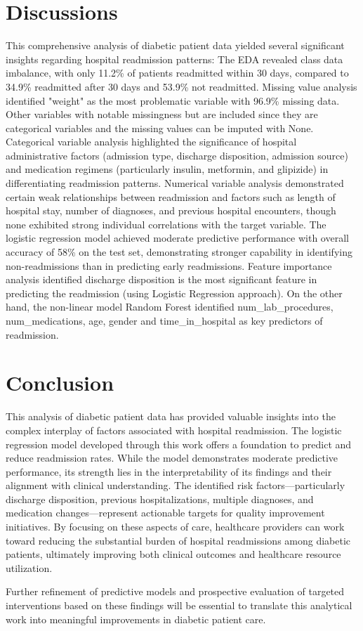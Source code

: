 \section{Discussions}

This comprehensive analysis of diabetic patient data yielded several significant insights regarding hospital readmission patterns: The EDA revealed class data imbalance, with only 11.2\% of patients readmitted within 30 days, compared to 34.9\% readmitted after 30 days and 53.9\% not readmitted.
Missing value analysis identified "weight" as the most problematic variable with 96.9\% missing data. 
Other variables with notable missingness but are included since they are categorical variables and the missing values can be imputed with None.
Categorical variable analysis highlighted the significance of hospital administrative factors (admission type, discharge disposition, admission source) and medication regimens (particularly insulin, metformin, and glipizide) in differentiating readmission patterns.
Numerical variable analysis demonstrated certain weak relationships between readmission and factors such as length of hospital stay, number of diagnoses, and previous hospital encounters, though none exhibited strong individual correlations with the target variable.
The logistic regression model achieved moderate predictive performance with overall accuracy of 58\% on the test set, demonstrating stronger capability in identifying non-readmissions than in predicting early readmissions.
Feature importance analysis identified discharge disposition is the most significant feature in predicting the readmission (using Logistic Regression approach).
On the other hand, the non-linear model Random Forest identified num\_lab\_procedures, num\_medications, age, gender and time\_in\_hospital as key predictors of readmission.

\section{Conclusion}

This analysis of diabetic patient data has provided valuable insights into the complex interplay of factors associated with hospital readmission.
The logistic regression model developed through this work offers a foundation to predict and reduce readmission rates.
While the model demonstrates moderate predictive performance, its strength lies in the interpretability of its findings and their alignment with clinical understanding.
The identified risk factors—particularly discharge disposition, previous hospitalizations, multiple diagnoses, and medication changes—represent actionable targets for quality improvement initiatives. By focusing on these aspects of care, healthcare providers can work toward reducing the substantial burden of hospital readmissions among diabetic patients, ultimately improving both clinical outcomes and healthcare resource utilization.

Further refinement of predictive models and prospective evaluation of targeted interventions based on these findings will be essential to translate this analytical work into meaningful improvements in diabetic patient care. 